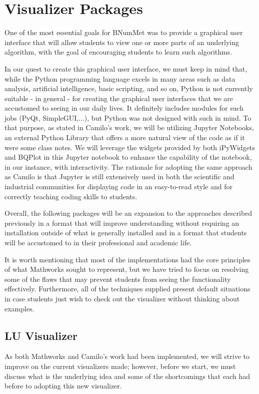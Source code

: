 \section{Visualizer Packages}
One of the most essential goals for BNumMet was to provide a graphical user interface that will allow students to view one or more parts of an underlying algorithm, with the goal of encouraging students to learn such algorithms.

In our quest to create this graphical user interface, we must keep in mind that, while the Python programming language excels in many areas such as data analysis, artificial intelligence, basic scripting, and so on, Python is not currently suitable - in general - for creating the graphical user interfaces that we are accustomed to seeing in our daily lives. It definitely includes modules for such jobs (PyQt, SimpleGUI,...), but Python was not designed with such in mind. To that purpose, as stated in Camilo's work, we will be utilizing Jupyter Notebooks, an external Python Library that offers a more natural view of the code as if it were some class notes. We will leverage the widgets provided by both iPyWidgets and BQPlot in this Jupyter notebook to enhance the capability of the notebook, in our instance, with  interactivity.  The rationale for adopting the same approach as Camilo is that Jupyter is still extensively used in both the scientific and industrial communities for displaying code in an easy-to-read style and for correctly teaching coding skills to students.

Overall, the following packages will be an expansion to the approaches described previously in a format that will improve understanding without requiring an installation outside of what is generally installed and in a format that students will be accustomed to in their professional and academic life.

It is worth mentioning that most of the implementations had the core principles of what Mathworks sought to represent, but we have tried to focus on resolving some of the flaws that may prevent students from seeing the functionality effectively. Furthermore, all of the techniques supplied present default situations in case students just wish to check out the visualizer without thinking about examples.

\subsection{LU Visualizer}
As both Mathworks and Camilo's work had been implemented, we will strive to improve on the current visualizers made; however, before we start, we must discuss what is the underlying idea and some of the shortcomings that each had before to adopting this new visualizer.


